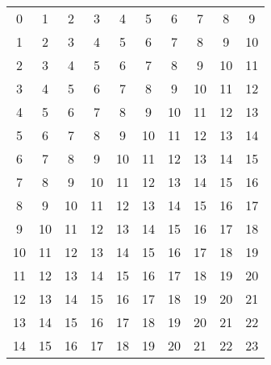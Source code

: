\documentclass{article}
\begin{document}
\begin{centering}
\begin{tabular}{cccccccccc}
0 & 1 & 2 & 3 & 4 & 5 & 6 & 7 & 8 & 9 \\
1 & 2 & 3 & 4 & 5 & 6 & 7 & 8 & 9 & 10 \\
2 & 3 & 4 & 5 & 6 & 7 & 8 & 9 & 10 & 11 \\
3 & 4 & 5 & 6 & 7 & 8 & 9 & 10 & 11 & 12 \\
4 & 5 & 6 & 7 & 8 & 9 & 10 & 11 & 12 & 13 \\
5 & 6 & 7 & 8 & 9 & 10 & 11 & 12 & 13 & 14 \\
6 & 7 & 8 & 9 & 10 & 11 & 12 & 13 & 14 & 15 \\
7 & 8 & 9 & 10 & 11 & 12 & 13 & 14 & 15 & 16 \\
8 & 9 & 10 & 11 & 12 & 13 & 14 & 15 & 16 & 17 \\
9 & 10 & 11 & 12 & 13 & 14 & 15 & 16 & 17 & 18 \\
10 & 11 & 12 & 13 & 14 & 15 & 16 & 17 & 18 & 19 \\
11 & 12 & 13 & 14 & 15 & 16 & 17 & 18 & 19 & 20 \\
12 & 13 & 14 & 15 & 16 & 17 & 18 & 19 & 20 & 21 \\
13 & 14 & 15 & 16 & 17 & 18 & 19 & 20 & 21 & 22 \\
14 & 15 & 16 & 17 & 18 & 19 & 20 & 21 & 22 & 23 \\
\end{tabular}
\end{centering}
\end{document}
